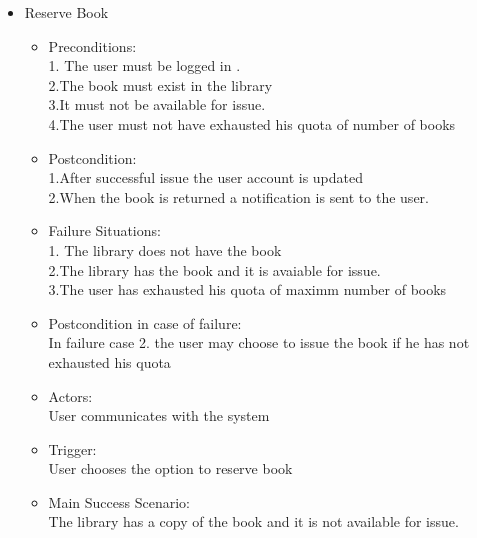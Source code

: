 \documentclass{article}
\begin{document}
\begin{enumerate}
\begin{itemize}
 \item Reserve Book\\
	\begin{itemize}
	\item  Preconditions:\\
	1. The user must be logged in .\\
	2.The book must exist in the library\\ 
	3.It must not  be available for issue.\\
	4.The user must not have exhausted his quota of number of books\\
 \item Postcondition:\\
 1.After successful issue the user account is updated \\
 2.When the book is returned a notification is sent to the user.\\
 \item Failure Situations:\\
 1. The library does not have  the book \\
 2.The library has the book and it is  avaiable for issue.\\
 3.The user has exhausted his quota of maximm number of books\\
 \item Postcondition in case of failure:\\In failure case 2. the user may choose to issue the book if he has not exhausted his quota\\
 \item Actors:\\ User communicates with the system\\
 \item Trigger:\\ User chooses the option to reserve book\\
 \item Main Success Scenario:\\ The library has a copy of the book and it is not available for issue.\\
 
	\end{itemize}
 

\end{itemize}
\end{enumerate}
\end{document}
